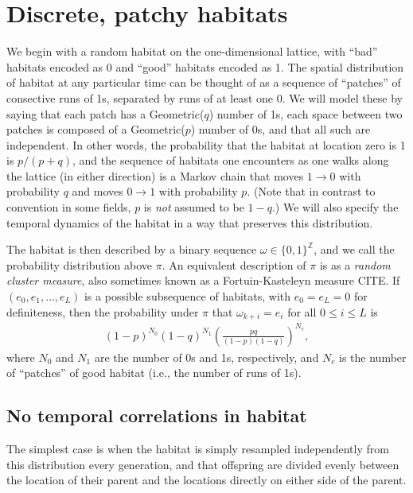 \documentclass{article}
\newcommand{\Z}{\mathbb{Z}}
\begin{document}
\section{Discrete, patchy habitats}

We begin with a random habitat on the one-dimensional lattice,
with ``bad'' habitats encoded as 0 and ``good'' habitats encoded as 1.
The spatial distribution of habitat at any particular time can be thought of as
a sequence of ``patches'' of consective runs of 1s, separated by runs of at least one 0.
We will model these by saying that each patch has a Geometric($q$) number of 1s,
each space between two patches is composed of a Geometric($p$) number of 0s,
and that all such are independent.
In other words, the probability that the habitat at location zero is 1 is $p/(p+q)$,
and the sequence of habitats one encounters as one walks along the lattice (in either direction)
is a Markov chain that moves $1 \to 0$ with probability $q$ and moves $0 \to 1$ with probability $p$.
(Note that in contrast to convention in some fields, $p$ is \emph{not} assumed to be $1-q$.)
We will also specify the temporal dynamics of the habitat in a way that preserves this distribution.

The habitat is then described by a binary sequence $\omega \in \{0,1\}^\Z$,
and we call the probability distribution above $\pi$.
An equivalent description of $\pi$ is as a \emph{random cluster measure}, 
also sometimes known as a Fortuin-Kasteleyn measure CITE.
If $(e_0, e_1, \ldots, e_L)$ is a possible subsequence of habitats,
with $e_0 = e_L = 0$ for definiteness,
then the probability under $\pi$ that $\omega_{k+i} = e_i$ for all $0 \le i \le L$
is
\begin{align}
    (1-p)^{N_0} (1-q)^{N_1} \left(\frac{pq}{(1-p)(1-q)}\right)^{N_c},
\end{align}
where $N_0$ and $N_1$ are the number of 0s and 1s, respectively,
and $N_c$ is the number of ``patches'' of good habitat (i.e., the number of runs of 1s).

\subsection{No temporal correlations in habitat}
The simplest case is when the habitat is simply resampled independently from this distribution
every generation,
and that offspring are divided evenly between the location of their parent and the locations
directly on either side of the parent.
\end{document}
